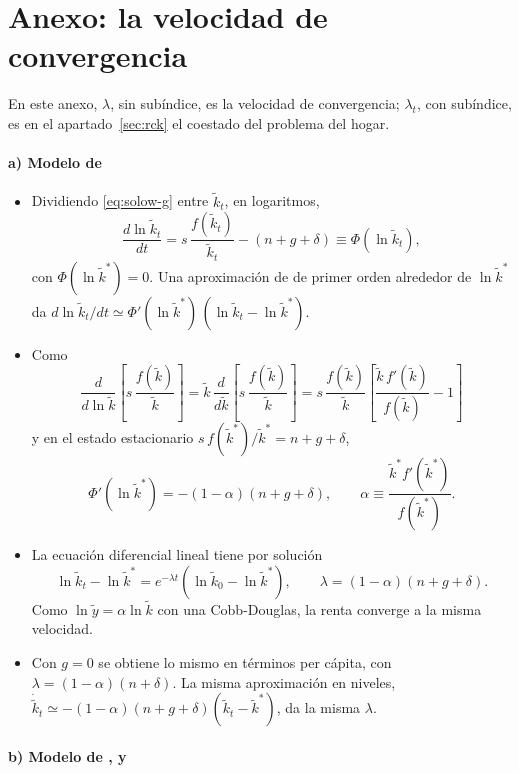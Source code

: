 \documentclass[11pt]{article}
\begin{document}
\section{Anexo: la velocidad de convergencia}\label{anexo:convergencia}

\begin{notaopositor}
En este anexo, $\lambda$, sin subíndice, es la velocidad de convergencia; $\lambda_t$, con subíndice, es en el apartado~\ref{sec:rck} el coestado del problema del hogar.
\end{notaopositor}

\paragraph{a) Modelo de }

\begin{itemize}
\item Dividiendo \eqref{eq:solow-g} entre $\tilde k_t$, en logaritmos,
  \[\frac{d\ln \tilde k_t}{dt}=s\,\frac{f(\tilde k_t)}{\tilde k_t}-(n+g+\delta)\equiv\Phi(\ln \tilde k_t),\]
  con $\Phi(\ln \tilde k^*)=0$. Una aproximación de  de primer orden alrededor de $\ln \tilde k^*$ da $d\ln \tilde k_t/dt\simeq\Phi'(\ln \tilde k^*)\,(\ln \tilde k_t-\ln \tilde k^*)$.
\item Como
  \[\frac{d}{d\ln \tilde k}\left[s\,\frac{f(\tilde k)}{\tilde k}\right]=\tilde k\,\frac{d}{d\tilde k}\left[s\,\frac{f(\tilde k)}{\tilde k}\right]=s\,\frac{f(\tilde k)}{\tilde k}\left[\frac{\tilde k\,f'(\tilde k)}{f(\tilde k)}-1\right]\]
  y en el estado estacionario $s\,f(\tilde k^*)/\tilde k^*=n+g+\delta$,
  \[\Phi'(\ln \tilde k^*)=-(1-\alpha)(n+g+\delta),\qquad \alpha\equiv\frac{\tilde k^*f'(\tilde k^*)}{f(\tilde k^*)}.\]
\item La ecuación diferencial lineal tiene por solución
  \[\ln \tilde k_t-\ln \tilde k^*=e^{-\lambda t}\left(\ln \tilde k_0-\ln \tilde k^*\right),\qquad \lambda=(1-\alpha)(n+g+\delta).\]
  Como $\ln\tilde y=\alpha\ln\tilde k$ con una Cobb-Douglas, la renta converge a la misma velocidad. \findemo
\item Con $g=0$ se obtiene lo mismo en términos per cápita, con $\lambda=(1-\alpha)(n+\delta)$. La misma aproximación en niveles, $\dot{\tilde k}_t\simeq-(1-\alpha)(n+g+\delta)(\tilde k_t-\tilde k^*)$, da la misma $\lambda$.
\end{itemize}

\paragraph{b) Modelo de ,  y }
\end{document}
